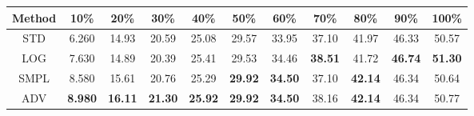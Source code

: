 \documentclass{standalone}
\begin{document}
\begin{tabular}{c|cccccccccc}
      \toprule
      Method & 10\% & 20\% & 30\% & 40\% & 50\% & 60\% & 70\% & 80\% & 90\% & 100\% \\
      \midrule
STD & 6.260 & 14.93 & 20.59 & 25.08 & 29.57 & 33.95 & 37.10 & 41.97 & 46.33 & 50.57\\
LOG & 7.630 & 14.89 & 20.39 & 25.41 & 29.53 & 34.46 & \textbf{38.51} & 41.72 & \textbf{46.74} & \textbf{51.30}\\
SMPL & 8.580 & 15.61 & 20.76 & 25.29 & \textbf{29.92} & \textbf{34.50} & 37.10 & \textbf{42.14} & 46.34 & 50.64\\
ADV & \textbf{8.980} & \textbf{16.11} & \textbf{21.30} & \textbf{25.92} & \textbf{29.92} & \textbf{34.50} & 38.16 & \textbf{42.14} & 46.34 & 50.77\\
  \bottomrule
\end{tabular}
\end{document}
